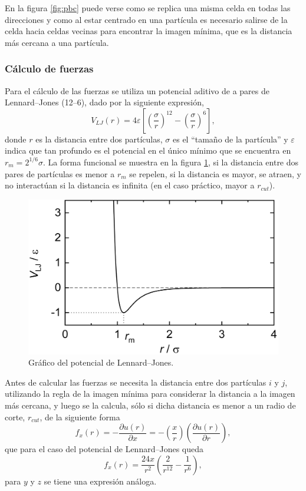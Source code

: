\documentclass[a4paper,spanish,12pt,twoside]{article}
\begin{document}
En la figura \ref{fig:pbc} puede verse como se replica una misma celda en todas las direcciones y como al estar centrado en una partícula es necesario salirse de la celda hacia celdas vecinas para encontrar la imagen mínima, que es la distancia más cercana a una partícula.

\subsubsection{Cálculo de fuerzas}

Para el cálculo de las fuerzas se utiliza un potencial aditivo de a pares de Lennard--Jones (12--6), dado por la siguiente expresión,
$$
V_{LJ}(r) = 4\varepsilon \left[ \left( \frac{\sigma}{r} \right)^{12} - \left( \frac{\sigma}{r} \right)^6 \right],
$$
donde $r$ es la distancia entre dos partículas, $\sigma$ es el ``tamaño de la partícula'' y $\varepsilon$ indica que tan profundo es el potencial en el único mínimo que se encuentra en $r_m = 2^{1/6}\sigma$. La forma funcional se muestra en la figura \ref{fig:lj}, si la distancia entre dos pares de partículas es menor a $r_m$ se repelen, si la distancia es mayor, se atraen, y no interactúan si la distancia es infinita (en el caso práctico, mayor a $r_{cut}$).
\begin{figure}[h]
	\centering
	\includegraphics[width=.7\textwidth]{lj.png}
	\caption{Gráfico del potencial de Lennard--Jones.}
	\label{fig:lj}
\end{figure}

Antes de calcular las fuerzas se necesita la distancia entre dos partículas $i$ y $j$, utilizando la regla de la imagen mínima para considerar la distancia a la imagen más cercana, y luego se la calcula, sólo si dicha distancia es menor a un radio de corte, $r_{cut}$, de la siguiente forma
$$
f_x(r) = -\frac{\partial u(r)}{\partial x} = - \left(\frac{x}{r}\right) \left( \frac{\partial u(r)}{\partial r} \right),
$$
que para el caso del potencial de Lennard--Jones queda
$$
f_x(r) = \frac{24x}{r^2} \left( \frac{2}{r^{12}} - \frac{1}{r^6} \right),
$$
para $y$ y $z$ se tiene una expresión análoga.
\end{document}
